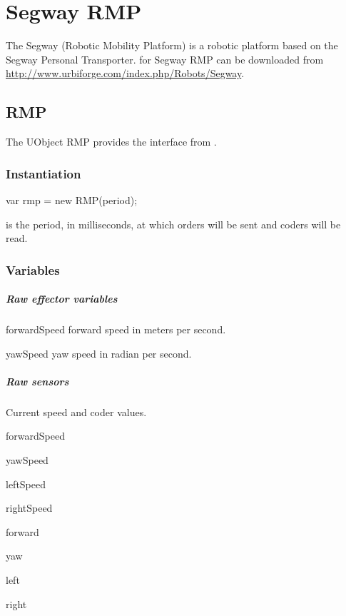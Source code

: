 
\chapter{Segway RMP}
\label{sec:segway-rmp}

The Segway  (Robotic Mobility Platform) is a robotic platform based
on the Segway Personal Transporter.  \urbi for Segway RMP can be downloaded
from \url{http://www.urbiforge.com/index.php/Robots/Segway}.

\section{RMP}

The UObject RMP provides the interface from \urbi.

\subsection{Instantiation}

\begin{urbiunchecked}
var rmp = new RMP(period);
\end{urbiunchecked}

 is the period, in milliseconds, at which orders will be sent
and coders will be read.

\subsection{Variables}

\paragraph{Raw effector variables}

\begin{urbiscriptapi}
\item[forwardSpeed] forward speed in meters per second.
\item[yawSpeed] yaw speed in radian per second.
\end{urbiscriptapi}

\paragraph{Raw sensors}
Current speed and coder values.
\begin{urbiscriptapi}
\item[forwardSpeed]
\item[yawSpeed]
\item[leftSpeed]
\item[rightSpeed]
\item[forward]
\item[yaw]
\item[left]
\item[right]
\end{urbiscriptapi}

